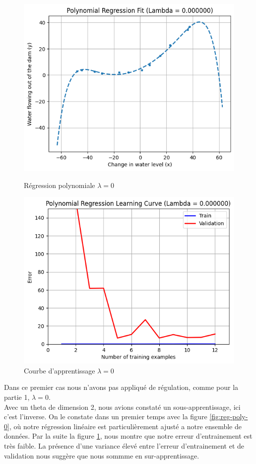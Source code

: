 \begin{figure}[!h]
    \begin{minipage}{.48\linewidth}
        \begin{center}
            \includegraphics[width=.8\textwidth]{./img/5.1(1).png}
            \caption{\label{fig:reg-poly-0}Régression polynomiale $\lambda = 0$}  
        \end{center}
    \end{minipage}\hfill
    \begin{minipage}{.48\linewidth}
        \begin{center}
            \includegraphics[width=.8\textwidth]{./img/5.1(2).png}
            \caption{\label{fig:learning-curve-poly-0}Courbe d'apprentissage $\lambda = 0$}  
        \end{center}
    \end{minipage}
\end{figure}

Dans ce premier cas nous n'avons pas appliqué de régulation, comme pour la partie 1, $\lambda = 0$. \\
Avec un theta de dimension 2, nous avions constaté un sous-apprentissage, ici c'est l'inverse. On le constate dans un premier temps avec la figure \ref{fig:reg-poly-0}, où notre régression linéaire est particulièrement ajusté a notre ensemble de données. Par la suite la figure 
\ref{fig:learning-curve-poly-0}, nous montre que notre erreur d'entrainement est très faible. La présence d'une variance élevé entre l'erreur d'entrainement et de validation nous suggère que nous sommme en sur-apprentissage.

